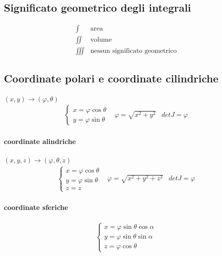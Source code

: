 \subsection{Significato geometrico degli integrali}
\begin{equation*}
	\begin{matrix}
		\int & \text{area}\\
		\iint & \text{volume}\\
		\iiint & \text{nessun significato geometrico}
	\end{matrix}
\end{equation*}
\subsection{Coordinate polari e coordinate cilindriche}
$(x,y) \to (\varphi,\theta)$
\begin{equation*}
	\begin{matrix}
		\begin{cases}
			x=\varphi \cos \theta\\
			y=\varphi \sin \theta
		\end{cases} & \varphi =\sqrt{x^2+y^2} &det J=\varphi
	\end{matrix}
\end{equation*}
\paragraph{coordinate alindriche}
$(x,y,z)\to (\varphi,\theta,z)$
\begin{equation*}
	\begin{matrix}
		\begin{cases}
			x=\varphi \cos \theta\\
			y=\varphi \sin \theta\\
			z=z
		\end{cases} & \varphi =\sqrt{x^2+y^2+z^2} &det J=\varphi
	\end{matrix}
\end{equation*}
\paragraph{coordinate sferiche}
\begin{equation*}
	\begin{matrix}
		\begin{cases}
			x=\varphi \sin\theta \cos \alpha\\
			y=\varphi \sin \theta \sin \alpha\\
			z=\varphi \cos\theta
		\end{cases} 
	\end{matrix}
\end{equation*}
